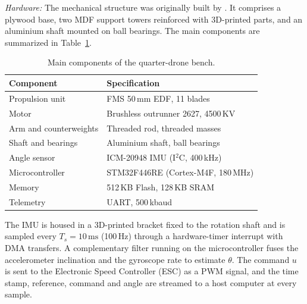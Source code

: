 \documentclass{ifacconf}
\newif\ifinstr \instrfalse
\newcommand{\instr}[1]{%
  \ifinstr
    \par\noindent
    \fcolorbox{orange!80!black}{yellow!20}{%
      \parbox{\dimexpr\linewidth-2\fboxsep-2\fboxrule}{%
        \small\sffamily\color{orange!40!black}%
        \textbf{Instrução:} #1}}%
    \par\medskip
  \fi}
\begin{document}
\textit{Hardware:} The mechanical structure was originally built by \citet{lima2025}. It comprises a plywood base, two MDF support towers reinforced with 3D-printed parts, and an aluminium shaft mounted on ball bearings. The main components are summarized in Table~\ref{tab:hardware_bom}.

\begin{table}[htbp]
\begin{center}
\caption{Main components of the quarter-drone bench.}\label{tab:hardware_bom}
\begin{tabular}{ll}
\toprule
\textbf{Component} & \textbf{Specification} \\ \midrule
Propulsion unit & FMS 50\,mm EDF, 11 blades \\
Motor & Brushless outrunner 2627, 4500\,KV \\
Arm and counterweights & Threaded rod, threaded masses \\
Shaft and bearings & Aluminium shaft, ball bearings \\
Angle sensor & ICM-20948 IMU (I$^2$C, 400\,kHz) \\
Microcontroller & STM32F446RE (Cortex-M4F, 180\,MHz) \\
Memory & 512\,KB Flash, 128\,KB SRAM \\
Telemetry & UART, 500\,kbaud \\ \bottomrule
\end{tabular}
\end{center}
\end{table}

\instr{Acrescentar as massas $m_1$, $m_2$ e braços $L_1$, $L_2$ medidos na bancada. Os valores da versão anterior (145\,g, 0,380\,m, 185\,g, 0,120\,m, mancais 608-2RS, MPU-6050) não constam no TCC e foram removidos.}

The IMU is housed in a 3D-printed bracket fixed to the rotation shaft and is sampled every $T_s = 10\,\mathrm{ms}$ (100\,Hz) through a hardware-timer interrupt with DMA transfers. A complementary filter running on the microcontroller fuses the accelerometer inclination and the gyroscope rate to estimate $\theta$. The command $u$ is sent to the Electronic Speed Controller (ESC) as a PWM signal, and the time stamp, reference, command and angle are streamed to a host computer at every sample.

\instr{Ecquipment used (components: bill of materials). Uma extensao do artigo do cobem}

\end{document}
